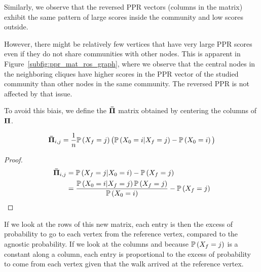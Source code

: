 Similarly, we observe that the reversed PPR vectors (columns in the matrix) exhibit the same pattern of large scores inside the community and low scores outside.

However, there might be relatively few vertices that have very large PPR scores even if they do not share communities with other nodes. This is apparent in Figure~\ref{subfig:ppr_mat_ros_graph}, where we observe that the central nodes in the neighboring cliques have higher scores in the PPR vector of the studied community than other nodes in the same community. The reversed PPR is not affected by that issue.


To avoid this biais, we define the $\boldsymbol{\Bar{\Pi}}$ matrix obtained by centering the columns of $\boldsymbol{\Pi}$.

\begin{property}
    \begin{equation*}
        \boldsymbol{\Bar{\Pi}}_{i, j} = \frac{1}{n}\mathbb{P}\left(X_f = j\right)\big(\mathbb{P}\left(X_0=i|X_f=j\right)-\mathbb{P}\left(X_0 = i\right)\big)
    \end{equation*}
\end{property}

\begin{proof}
\begin{align*}
        \boldsymbol{\Bar{\Pi}}_{i, j} & =  \mathbb{P}\left(X_f = j | X_0 = i\right) - \mathbb{P}\left(X_f = j\right) \\
         & =  \frac{\mathbb{P}\left(X_0 = i | X_f = j\right)\mathbb{P}\left(X_f = j\right)}{
            \mathbb{P}\left(X_0=i\right)
        }
         - \mathbb{P}\left(X_f = j\right)
\end{align*}
\end{proof}
If we look at the rows of this new matrix, each entry is then the excess of probability to go to each vertex from the reference vertex, compared to the agnostic probability. If we look at the columns and because $\mathbb{P}\left(X_f =j\right)$ is a constant along a column, each entry is proportional to the excess of probability to come from each vertex given that the walk arrived at the reference vertex.


